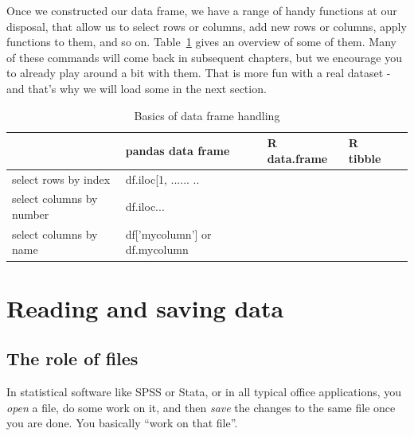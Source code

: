 Once we constructed our data frame, we have a range of handy functions at our disposal, that allow us to select rows or columns, add new rows or columns, apply functions to them, and so on. Table~\ref{tab:dataframecommands} gives an overview of some of them. Many of these commands will come back in subsequent chapters, but we encourage you to already play around a bit with them. That is more fun with a real dataset - and that's why we will load some in the next section.


\begin{table}[]
\caption{Basics of data frame handling}
\label{tab:dataframecommands}
\begin{tabularx}{\textwidth}{XXXXX}
\toprule
                         & pandas data frame                 & R data.frame & R tibble \\ \midrule
select rows by index     & df.iloc{[}1, ...... ..            &              &          \\
select columns by number & df.iloc...                        &              &          \\
select columns by name   & df{[}'mycolumn'{]} or df.mycolumn &              &          \\ \bottomrule
\end{tabularx}
\end{table}






\section{Reading and saving data}
\label{sec:reading}

\subsection{The role of files}

In statistical software like SPSS or Stata, or in all typical office applications, you \emph{open} a file, do some work on it, and then \emph{save} the changes to the same file once you are done. You basically ``work on that file''.

